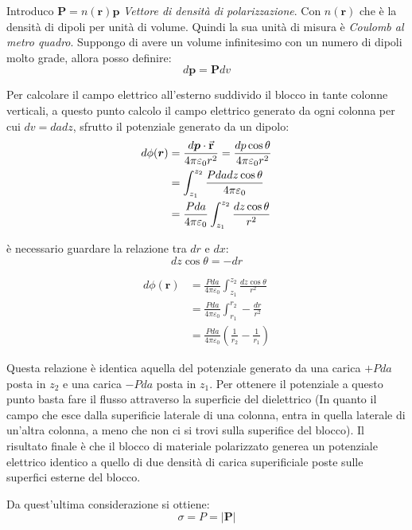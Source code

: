 \documentclass[a4paper]{scrarticle}
\begin{document}
Introduco $\bm P = n(\bm r)\bm p$ \emph{Vettore di densità di polarizzazione}.
Con $n(\bm r)$ che è la densità di dipoli per unità di volume.
Quindi la sua unità di misura è \emph{Coulomb al metro quadro}.
Suppongo di avere un volume infinitesimo con un numero di dipoli molto grade, allora posso definire:
\begin{equation*}
    d\bm p = \bm P dv
\end{equation*}

Per calcolare il campo elettrico all'esterno suddivido il blocco in tante colonne verticali, a questo punto calcolo il campo elettrico generato da ogni colonna per cui $dv = da dz$, sfrutto il potenziale generato da un dipolo:
\begin{align*}
    d\phi(\bm r) &= \frac{d\bm p \cdot \va r}{4\pi\varepsilon_0r^2}= \frac{dp\cos\theta}{4\pi\varepsilon_0r^2}\\
    &= \int_{z_1}^{z_2}\frac{Pdadz\cos \theta}{4\pi\varepsilon_0}\\
    &= \frac{Pda}{4\pi\varepsilon_0}\int_{z_1}^{z_2}\frac{dz \cos \theta}{r^2}
\end{align*}

è necessario guardare la relazione tra $dr$ e $dx$:
\begin{equation*}
    dz \cos \theta = -dr
\end{equation*}

\begin{align*}
    d\phi(\bm r) &= \frac{Pda}{4\pi\varepsilon_0} \int_{z_1}^{z_2}\frac{dz\cos\theta}{r^2}\\
    &= \frac{Pda}{4\pi\varepsilon_0} \int_{r_1}^{r_2} - \frac{dr}{r^2}\\
    &= \frac{Pda}{4\pi\varepsilon_0} (\frac{1}{r_2}- \frac{1}{r_1})
\end{align*}

Questa relazione è identica  aquella del potenziale generato da una carica $+Pda$ posta in $z_2$ e una carica $-Pda$ posta in $z_1$.
Per ottenere il potenziale a questo punto basta fare il flusso attraverso la superficie del dielettrico (In quanto il campo che esce dalla superificie laterale di una colonna, entra in quella laterale di un'altra colonna, a meno che non ci si trovi sulla superifice del blocco).
Il risultato finale è che il blocco di materiale polarizzato generea un potenziale elettrico identico a quello di due densità di carica superificiale poste sulle superfici esterne del blocco.

Da quest'ultima considerazione si ottiene:
\begin{equation}
    \sigma  = P = |\bm P|
\end{equation}
\end{document}
